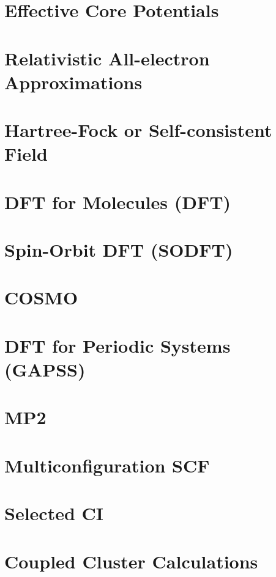 \chapter{Effective Core Potentials}


\chapter{Relativistic All-electron Approximations}


\chapter{Hartree-Fock or Self-consistent Field} 


\chapter{DFT for Molecules (DFT)}


\chapter{Spin-Orbit DFT (SODFT)}


\chapter{COSMO}


\chapter{DFT for Periodic Systems (GAPSS)}


\chapter{MP2}


\chapter{Multiconfiguration SCF}


\chapter{Selected CI}


\chapter{Coupled Cluster Calculations}


